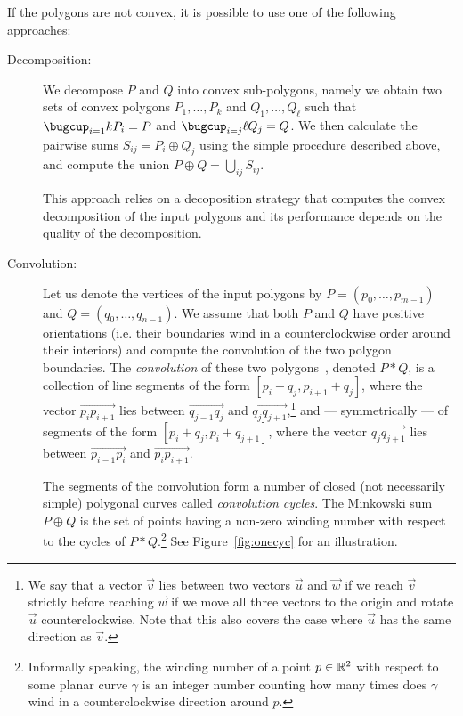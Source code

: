 If the polygons are not convex, it is possible to use one of the following
approaches:
\begin{description}
\item[Decomposition:]
We decompose $P$ and $Q$ into convex sub-polygons, namely we obtain two
sets of convex polygons $P_1, \ldots, P_k$ and $Q_1, \ldots, Q_\ell$ such
that $\bugcup_{i = 1}{k}{P_i} = P$ and $\bugcup_{i = j}{\ell}{Q_j} = Q$.
We then calculate the pairwise sums $S_{ij} = P_i \oplus Q_j$ using the
simple procedure described above, and compute the union $P \oplus Q =
\bigcup_{ij}{S_{ij}}$.

This approach relies on a decoposition strategy that computes the convex
decomposition of the input polygons and its performance depends on the
quality of the decomposition.
%
\item[Convolution:]
Let us denote the vertices of the input polygons by
$P = \left( p_0, \ldots, p_{m-1} \right)$ and
$Q = \left( q_0, \ldots, q_{n-1} \right)$. We assume that both $P$ and $Q$
have positive orientations (i.e. their boundaries wind in a counterclockwise
order around their interiors) and compute the convolution of the two polygon
boundaries. The {\em convolution} of these two polygons~\cite{grs-kfcg-83},
denoted $P * Q$, is a collection of line segments of the form
$[p_i + q_j, p_{i+1} + q_j]$, where the vector $\overrightarrow{p_i p_{i+1}}$
lies between $\overrightarrow{q_{j-1} q_j}$ and $\overrightarrow{q_j
q_{j+1}}$,\footnote{We say that a vector $\vec{v}$ lies between
two vectors $\vec{u}$ and $\vec{w}$ if we reach $\vec{v}$ strictly
before reaching $\vec{w}$ if we move all three vectors to the origin
and rotate $\vec{u}$ counterclockwise. Note that this also covers
the case where $\vec{u}$ has the same direction as $\vec{v}$.} and
--- symmetrically --- of segments of the form $[p_i + q_j, p_i + q_{j+1}]$,
where the vector $\overrightarrow{q_j q_{j+1}}$ lies between
$\overrightarrow{p_{i-1} p_i}$ and $\overrightarrow{p_i p_{i+1}}$.

The segments of the convolution form a number of closed (not
necessarily simple) polygonal curves called \emph{convolution
cycles}. The Minkowski sum $P \oplus Q$ is the set of points
having a non-zero winding number with respect to the cycles
of $P * Q$.\footnote{Informally speaking, the winding number of a point
$p \in \mathbb{R}^2$ with respect to some planar curve $\gamma$ is an
integer number counting how many times does $\gamma$ wind in a
counterclockwise direction around $p$.} See Figure~\ref{fig:onecyc} for
an illustration.
\end{description}

